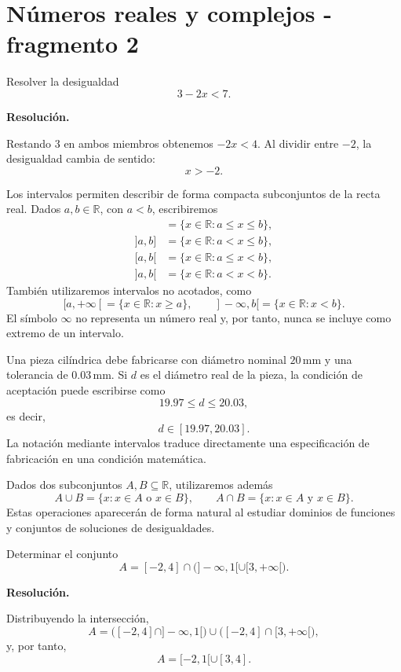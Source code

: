 \section{Números reales y complejos - fragmento 2}
\begin{example}
Resolver la desigualdad
\[
3-2x<7.
\]

\textbf{Resolución.}\par\smallskip
Restando \(3\) en ambos miembros obtenemos \(-2x<4\). Al dividir entre \(-2\), la desigualdad cambia de sentido:
\[
x>-2.
\]
\end{example}

Los intervalos permiten describir de forma compacta subconjuntos de la recta real. Dados \(a,b\in\mathbb{R}\), con \(a<b\), escribiremos
\begin{align*}
[a,b]&=\{x\in\mathbb{R}:a\leq x\leq b\},\\
]a,b]&=\{x\in\mathbb{R}:a<x\leq b\},\\
[a,b[&=\{x\in\mathbb{R}:a\leq x<b\},\\
]a,b[&=\{x\in\mathbb{R}:a<x<b\}.
\end{align*}
También utilizaremos intervalos no acotados, como
\[
[a,+\infty[=\{x\in\mathbb{R}:x\geq a\},
\qquad
]-\infty,b[=\{x\in\mathbb{R}:x<b\}.
\]
El símbolo \(\infty\) no representa un número real y, por tanto, nunca se incluye como extremo de un intervalo.

\begin{example}
Una pieza cilíndrica debe fabricarse con diámetro nominal \(20\,\mathrm{mm}\) y una tolerancia de \(0.03\,\mathrm{mm}\). Si \(d\) es el diámetro real de la pieza, la condición de aceptación puede escribirse como
\[
19.97\leq d\leq20.03,
\]
es decir,
\[
d\in[19.97,20.03].
\]
La notación mediante intervalos traduce directamente una especificación de fabricación en una condición matemática.
\end{example}

Dados dos subconjuntos \(A,B\subseteq\mathbb{R}\), utilizaremos además
\[
A\cup B=\{x:x\in A\text{ o }x\in B\},
\qquad
A\cap B=\{x:x\in A\text{ y }x\in B\}.
\]
Estas operaciones aparecerán de forma natural al estudiar dominios de funciones y conjuntos de soluciones de desigualdades.

\begin{solvedexercise}
Determinar el conjunto
\[
A=[-2,4]\cap\bigl(]-\infty,1[\cup[3,+\infty[\bigr).
\]

\textbf{Resolución.}\par\smallskip
Distribuyendo la intersección,
\[
A=\bigl([-2,4]\cap]-\infty,1[\bigr)\cup
\bigl([-2,4]\cap[3,+\infty[\bigr),
\]
y, por tanto,
\[
A=[-2,1[\cup[3,4].
\]
\end{solvedexercise}

